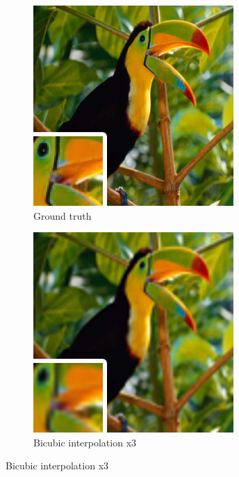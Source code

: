 \documentclass[
			fontsize = 12pt,
			paper = a4
			]
			{scrartcl}%
\newcommand{\?}{\ensuremath{^\texttt{\textbf [CITATION~NEEDED]}}}
\begin{document}
\begin{figure}[!ht]
     \centering
     \begin{subfigure}[b]{0.3\textwidth}
         \centering
         \caption{Ground truth}
         \includegraphics[width=\textwidth]{fig/examples/bird_GT}
     \end{subfigure}
     \hfill
     \begin{subfigure}[b]{0.3\textwidth}
         \centering
         \caption{Bicubic interpolation x3}
         \includegraphics[width=\textwidth]{fig/examples/bird_bicubic_x3}

\end{subfigure}
\end{figure}
\end{document}
